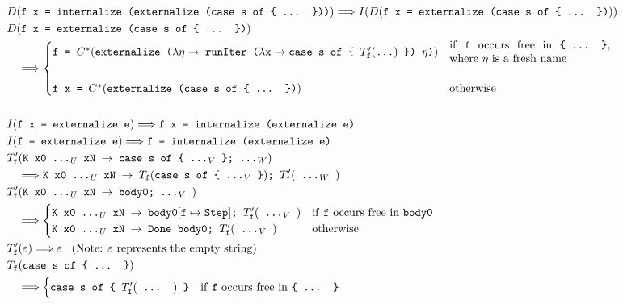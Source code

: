 \documentclass[sigplan,anonymous,review]{acmart}
\newcommand{\expr}[1]{(#1)} %
\newcommand{\rarr}{\rightarrow}
\newcommand{\rewrites}{\Longrightarrow}
\newcommand{\tdots}{\ttt{...}}
\newcommand{\exprdots}{\expr{\tdots}}
\newcommand{\ttt}{\texttt}
\begin{document}
\begin{figure}[hp]
  \centering
\begin{align*}
  &D\expr{\ttt{f x = internalize (externalize (case s of \{ ... \}))}}
      \rewrites I(D(\ttt{f x = externalize (case s of \{ ... \})}))\\
  &D\expr{\ttt{f x = externalize (case s of \{ ... \})}}\\
      &\quad\rewrites \begin{cases}
        \ttt{f = $C^{*}\expr{\ttt{externalize ($\lambda \eta \rarr$ runIter ($\lambda \ttt{x} \rarr \ttt{case s of \{ $T'_{\ttt{f}}\exprdots$}$ \}) $\eta$)}}$} & \text{\parbox{5cm}{if \ttt{f} occurs free in \ttt{\{ ... \}}, where $\eta$ is a fresh name}}\\
        \\
        \ttt{f x = $C^{*}\expr{\ttt{externalize (case s of \{ ... \})}}$} & \text{otherwise}
      \end{cases}\\
  &\\
  &I\expr{\ttt{f x = externalize e}} \rewrites \ttt{f x = internalize (externalize e)}\\
  &I\expr{\ttt{f = externalize e}} \rewrites \ttt{f = internalize (externalize e)}\\
  &T'_{\ttt{f}}\expr{\ttt{K x0 ...$_U$ xN $\rarr$ case s of \{ ...$_V$ \}; ...$_W$}}\\
    &\quad\rewrites
        \ttt{K x0 ...$_U$ xN $\rarr$ $T_{\ttt{f}}\expr{\ttt{case s of \{ ...$_V$ \}}}$; $T'_{\ttt{f}}\expr{\ttt{ ...$_W$ }}$}\\
  &T'_{\ttt{f}}\expr{\ttt{K x0 ...$_U$ xN $\rarr$ body0; ...$_V$ }}\\
    &\quad\rewrites
      \begin{cases}
        \ttt{K x0 ...$_U$ xN $\rarr$ body0}[\ttt{f} \mapsto \ttt{Step}]\ttt{; }T'_{\ttt{f}}\expr{\ttt{ ...$_V$ }} & \text{if \ttt{f} occurs free in \ttt{body0}}\\
        \ttt{K x0 ...$_U$ xN $\rarr$ Done body0; $T'_{\ttt{f}}\expr{\ttt{ ...$_V$ }}$} & \text{otherwise}
      \end{cases}\\
  &T'_{\ttt{f}}\expr{\varepsilon} \rewrites \varepsilon\;\;\; \text{(Note: $\varepsilon$ represents the empty string)}\\
  &T_{\ttt{f}}\expr{\ttt{case s of \{ ... \}}}\\
    &\quad\rewrites
      \begin{cases}
        \ttt{case s of \{ $T'_{\ttt{f}}\expr{\ttt{ ... }}$ \}} & \text{if \ttt{f} occurs free in \ttt{\{ ... \}}}\\

\end{cases}
\end{align*}
\end{figure}
\end{document}
